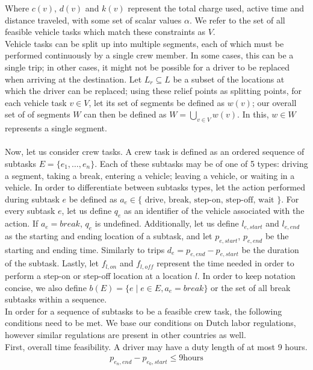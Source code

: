 \documentclass[]{article}
\begin{document}
Where $c(v)$, $d(v)$ and $k(v)$ represent the total charge used, active time and distance traveled, with some set of scalar values $\alpha$. We refer to the set of all feasible vehicle tasks which match these constraints as $V$. \\
Vehicle tasks can be split up into multiple segments, each of which must be performed continuously by a single crew member. In some cases, this can be a single trip; in other cases, it might not be possible for a driver to be replaced when arriving at the destination. Let $L_r \subseteq L$ be a subset of the locations at which the driver can be replaced; using these relief points as splitting points, for each vehicle task $v \in V$, let its set of segments be defined as $w(v)$; our overall set of of segments $W$ can then be defined as $W = \bigcup_{v \in V}w(v)$. In this, $w \in W$ represents a single segment. \\\\
Now, let us consider crew tasks. A crew task is defined as an ordered sequence of subtasks $E = \{ e_1, \dots, e_n \}$. Each of these subtasks may be of one of 5 types: driving a segment, taking a break, entering a vehicle; leaving a vehicle, or waiting in a vehicle. In order to differentiate between subtasks types, let the action performed during subtask $e$ be defined as $a_e \in \{\text{ drive, break, step-on, step-off, wait }\}$. For every subtask $e$, let us define $q_e$ as an identifier of the vehicle associated with the action. If $a_e = break$, $q_e$ is undefined. Additionally, let us define $l_{e,start}$ and $l_{e,end}$ as the starting and ending location of a subtask, and let $p_{e,start}$, $p_{e,end}$ be the starting and ending time. Similarly to trips $d_e = p_{e,end} - p_{e,start}$ be the duration of the subtask. Lastly, let $f_{l,on}$ and $f_{l,\textit{off}}$ represent the time needed in order to perform a step-on or step-off location at a location $l$. In order to keep notation concise, we also define $b(E) = \{ e \mid e \in E, a_e = break \}$ or the set of all break subtasks within a sequence.\\
In order for a sequence of subtasks to be a feasible crew task, the following conditions need to be met. We base our conditions on Dutch labor regulations, however similar regulations are present in other countries as well. \\ 
First, overall time feasibility. A driver may have a duty length of at most 9 hours. \\
\begin{align}
  p_{e_n,end} - p_{e_0,start} \leq 9\text{hours}
\end{align}
\end{document}
